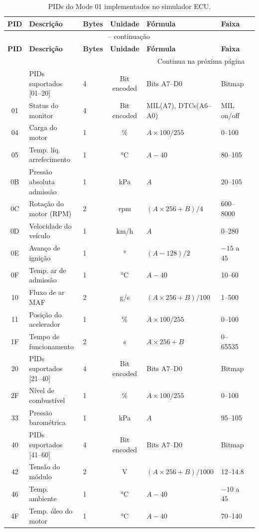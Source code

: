 \begin{longtable}{@{}cllclll@{}}
\caption{PIDs do Mode 01 implementados no simulador ECU.} \label{tab:pids-mode01} \\
\toprule
\textbf{PID} & \textbf{Descrição} & \textbf{Bytes} & \textbf{Unidade} & \textbf{Fórmula} & \textbf{Faixa} \\
\midrule
\endfirsthead
\multicolumn{6}{c}{\tablename\ \thetable{} -- continuação} \\
\toprule
\textbf{PID} & \textbf{Descrição} & \textbf{Bytes} & \textbf{Unidade} & \textbf{Fórmula} & \textbf{Faixa} \\
\midrule
\endhead
\midrule
\multicolumn{6}{r}{Continua na próxima página} \\
\endfoot
\bottomrule
\endlastfoot
00 & PIDs suportados [01--20] & 4 & Bit encoded & Bits A7--D0 & Bitmap \\
01 & Status do monitor & 4 & Bit encoded & MIL(A7), DTCs(A6--A0) & MIL on/off \\
04 & Carga do motor & 1 & \% & $A \times 100 / 255$ & 0--100 \\
05 & Temp. líq. arrefecimento & 1 & °C & $A - 40$ & 80--105 \\
0B & Pressão absoluta admissão & 1 & kPa & $A$ & 20--105 \\
0C & Rotação do motor (RPM) & 2 & rpm & $(A \times 256 + B) / 4$ & 600--8000 \\
0D & Velocidade do veículo & 1 & km/h & $A$ & 0--280 \\
0E & Avanço de ignição & 1 & ° & $(A - 128) / 2$ & $-15$ a $45$ \\
0F & Temp. ar de admissão & 1 & °C & $A - 40$ & 10--60 \\
10 & Fluxo de ar MAF & 2 & g/s & $(A \times 256 + B) / 100$ & 1--500 \\
11 & Posição do acelerador & 1 & \% & $A \times 100 / 255$ & 0--100 \\
1F & Tempo de funcionamento & 2 & s & $A \times 256 + B$ & 0--65535 \\
20 & PIDs suportados [21--40] & 4 & Bit encoded & Bits A7--D0 & Bitmap \\
2F & Nível de combustível & 1 & \% & $A \times 100 / 255$ & 0--100 \\
33 & Pressão barométrica & 1 & kPa & $A$ & 95--105 \\
40 & PIDs suportados [41--60] & 4 & Bit encoded & Bits A7--D0 & Bitmap \\
42 & Tensão do módulo & 2 & V & $(A \times 256 + B) / 1000$ & 12--14.8 \\
46 & Temp. ambiente & 1 & °C & $A - 40$ & $-10$ a $45$ \\
4F & Temp. óleo do motor & 1 & °C & $A - 40$ & 70--140 \\
\end{longtable}

